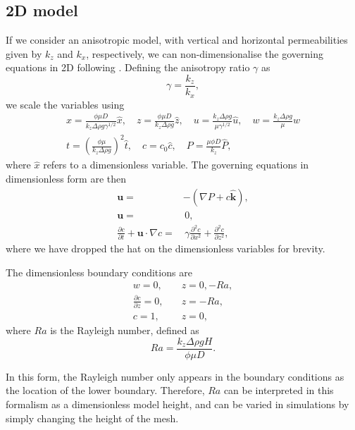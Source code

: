 \documentclass[11pt, a4paper]{csiroreport2012}
\begin{document}
\subsection{2D model}

If we consider an anisotropic model, with vertical and horizontal permeabilities given by $k_z$ and $k_x$, respectively, we can non-dimensionalise the governing equations in 2D following \cite{EnnisKing2005}. Defining the anisotropy ratio $\gamma$ as
\begin{equation}
\gamma = \frac{k_z}{k_x},
\label{eq:gamma}
\end{equation}
we scale the variables using
\begin{align}
x = \frac{\phi \mu D}{k_z \Delta \rho g \gamma^{1/2}} \hat{x}, \quad z =  \frac{\phi \mu D}{k_z \Delta \rho g} \hat{z}, \quad u = \frac{k_z \Delta \rho g}{\mu \gamma^{1/2}} \hat{u}, \quad w = \frac{k_z \Delta \rho g}{\mu} \hat{w} \nonumber \\
t = \left(\frac{\phi \mu}{k_z \Delta \rho g}\right)^2 \hat{t}, \quad c = c_0 \hat{c}, \quad P = \frac{\mu \phi D}{k_z}\hat{P}, \qquad \qquad \qquad
\label{eq:scales}
\end{align}
where $\hat{x}$ refers to a dimensionless variable. The governing equations in dimensionless form are then
\begin{align}
\mathbf{u} = & - \left(\nabla P + c \mathbf{\hat{k}}\right), \label{eq:darcydim}\\
\mathbf{u} = & \,0, \label{eq:ctydim} \\
\frac{\partial c}{\partial t} + \mathbf{u} \cdot \nabla c = &\,  \gamma \frac{\partial^2 c}{\partial x^2} + \frac{\partial^2 c}{\partial z^2}, \label{eq:condiffdim}
\end{align}
where we have dropped the hat on the dimensionless variables for brevity.

The dimensionless boundary conditions are
\begin{align}
w = 0,&  \quad z = 0, -Ra, \label{eq:dimbc1} \\
\frac{\partial c}{\partial z} = 0,& \quad z = -Ra, \label{eq:dimbc2}\\
c = 1,& \quad z = 0, \label{eq:dimbc3}
\end{align}
where $Ra$ is the Rayleigh number, defined as
\begin{equation}
Ra = \frac{k_z \Delta \rho g H}{\phi \mu D}.
\label{eq:ra}
\end{equation}

In this form, the Rayleigh number only appears in the boundary conditions as the location of the lower boundary. Therefore, $Ra$ can be interpreted in this formalism as a dimensionless model height, and can be varied in simulations by simply changing the height of the mesh.
\end{document}
